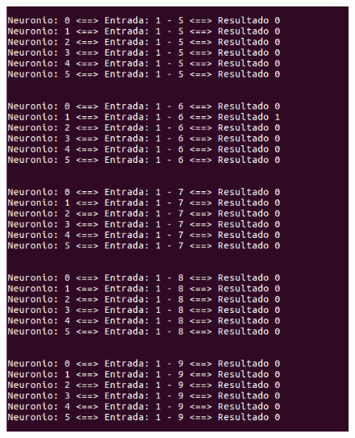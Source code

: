 \documentclass[hidelinks,12pt]{article}
\begin{document}
		\begin{figure}[!h]
			\centering
			\includegraphics[scale=0.5]{Figures/E3S1P2R.png}
		\end{figure}
		
\end{document}
